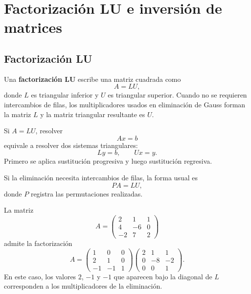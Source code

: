 \documentclass[a4,11pt]{aleph-notas}
\begin{document}
\section{Factorización LU e inversión de matrices}

\subsection{Factorización LU}

\begin{defi}[Factorización LU]
    Una \textbf{factorización LU} escribe una matriz cuadrada como
    \[
        A=LU,
    \]
    donde $L$ es triangular inferior y $U$ es triangular superior. Cuando no se requieren intercambios de filas, los multiplicadores usados en eliminación de Gauss forman la matriz $L$ y la matriz triangular resultante es $U$.
\end{defi}

\begin{defi}
    Si $A=LU$, resolver
    \[
        A{x}={b}
    \]
    equivale a resolver dos sistemas triangulares:
    \[
        L{y}={b},
        \qquad
        U{x}={y}.
    \]
    Primero se aplica sustitución progresiva y luego sustitución regresiva.
\end{defi}

\begin{advertencia}
    Si la eliminación necesita intercambios de filas, la forma usual es
    \[
        PA=LU,
    \]
    donde $P$ registra las permutaciones realizadas.
\end{advertencia}

\begin{ejem}
    La matriz
    \[
        A=
        \begin{pmatrix}
            2 & 1 & 1\\
            4 & -6 & 0\\
            -2 & 7 & 2
        \end{pmatrix}
    \]
    admite la factorización
    \[
        A=
        \begin{pmatrix}
            1 & 0 & 0\\
            2 & 1 & 0\\
            -1 & -1 & 1
        \end{pmatrix}
        \begin{pmatrix}
            2 & 1 & 1\\
            0 & -8 & -2\\
            0 & 0 & 1
        \end{pmatrix}.
    \]
    En este caso, los valores $2$, $-1$ y $-1$ que aparecen bajo la diagonal de $L$ corresponden a los multiplicadores de la eliminación.
\end{ejem}
\end{document}
